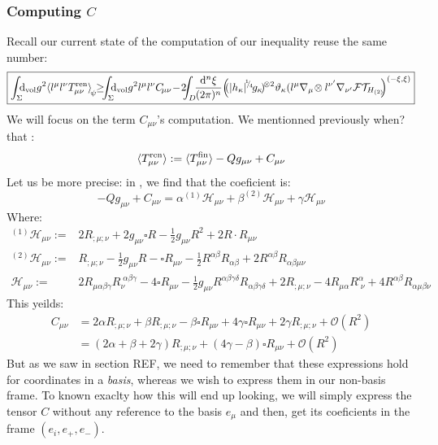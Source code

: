\documentclass[a4paper,11pt]{article}
\numberwithin{equation}{section}
\theoremstyle{definition}
\renewcommand{\d}{{\mathrm{d}}}
\begin{document}
\subsubsection{Computing $C$}
Recall our current state of the computation of our inequality \color{red}reuse the same number\color{black}:
\begin{equation}
    \boxed{\int_\Sigma \!\!\!\d_\mathrm{vol} g^2 \!\braket{l^\mu l^\nu T^\mathrm{ren}_{\mu\nu}}_{\!\psi} \!\!\geq\!\!\! \int_\Sigma \!\!\!\d_\mathrm{vol} g^2l^\mu l^\nu C_{\!\mu\nu}\!-\!2\!\!\!\int_D\!\!\frac{\d^n\xi}{(2\pi)^n}\!\left(\!\!(|h_\kappa|^{\!^1\!\!/_{\!4}}\!g_\kappa\!)^{\!\otimes 2}\vartheta_\kappa(l^\mu\nabla_\mu\!\otimes l^{\nu'}\nabla_{\nu'}\mathcal{FT}_{\!\!H_{(2)}}\!\!\right)^{(-\xi,\xi)}}
\end{equation}
We will focus on the term $C_{\mu\nu}$'s computation. We mentionned previously \color{red} when? \color{black} that :
\begin{equation}
    \braket{T^\mathrm{ren}_{\mu\nu}}:=\braket{T^\mathrm{fin}_{\mu\nu}}-Qg_{\mu\nu} + C_{\mu\nu}
    \end{equation}
Let us be more precise: in \cite{QFTCurv}, we find that the coeficient is:
\begin{equation}
    -Qg_{\mu\nu}+C_{\mu\nu}=\alpha^{(1)}\mathcal{H}_{\mu\nu}+\beta^{(2)}\mathcal{H}_{\mu\nu}+\gamma\mathcal{H}_{\mu\nu}
\end{equation}
Where:
\begin{align}
    ^{(1)}\mathcal{H}_{\mu\nu}:=& 2R_{;\mu;\nu}+ 2g_{\mu\nu}\square R - \frac{1}{2}g_{\mu\nu} R^2 + 2 R\cdot R_{\mu\nu}\\
    ^{(2)}\mathcal{H}_{\mu\nu}:=& R_{;\mu;\nu} - \frac{1}{2}g_{\mu\nu}R-\square R_{\mu\nu} -\frac{1}{2} R^{\alpha\beta}R_{\alpha\beta}+2R^{\alpha\beta}R_{\alpha\beta\mu\nu}\\
    \mathcal{H}_{\mu\nu}:=& 2R_{\mu\alpha\beta\gamma}R_\nu^{\;\alpha\beta\gamma}-4\square R_{\mu\nu} -\frac{1}{2}g_{\mu\nu}R^{\alpha\beta\gamma\delta}R_{\alpha\beta\gamma\delta} + 2 R_{;\mu;\nu} - 4 R_{\mu\alpha}R^{\alpha}_{\;\nu}+4R^{\alpha\beta}R_{\alpha\mu\beta\nu}
\end{align}
This yeilds:
\begin{align*}
    C_{\mu\nu} &= 2\alpha R_{;\mu;\nu} + \beta R_{;\mu;\nu} - \beta\square R_{\mu\nu} +4\gamma \square R_{\mu\nu} + 2\gamma R_{;\mu;\nu} + \mathcal{O}(R^2)\\
    &= (2\alpha + \beta + 2\gamma) R_{;\mu;\nu} +(4\gamma- \beta)\square R_{\mu\nu} + \mathcal{O}(R^2)
\end{align*}
But as we saw in section \color{red}REF\color{black}, we need to remember that these expressions hold for coordinates in a \emph{basis}, whereas we wish to express them in our non-basis frame. To known exaclty how this will end up looking, we will simply express the tensor $C$ without any reference to the basis $e_\mu$ and then, get its coeficients in the frame $(e_i,e_+,e_-)$.
\end{document}
